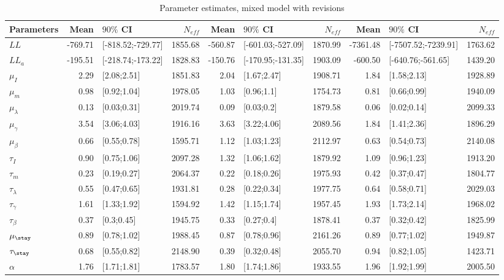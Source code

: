 \begin{table}

\caption{\label{tab:}Parameter estimates, mixed model with revisions}
\centering
\begin{tabular}[t]{lrlrrlrrlr}
\toprule
Parameters & Mean & $90\%$ CI & $N_{eff}$ & Mean & $90\%$ CI & $N_{eff}$ & Mean & $90\%$ CI & $N_{eff}$\\
\midrule
$LL$ & -769.71 & [-818.52;-729.77] & 1855.68 & -560.87 & [-601.03;-527.09] & 1870.99 & -7361.48 & [-7507.52;-7239.91] & 1763.62\\
$LL_a$ & -195.51 & [-218.74;-173.22] & 1828.83 & -150.76 & [-170.95;-131.35] & 1903.09 & -600.50 & [-640.76;-561.65] & 1439.20\\
$\mu_I$ & 2.29 & [2.08;2.51] & 1851.83 & 2.04 & [1.67;2.47] & 1908.71 & 1.84 & [1.58;2.13] & 1928.89\\
$\mu_m$ & 0.98 & [0.92;1.04] & 1978.05 & 1.03 & [0.96;1.1] & 1754.73 & 0.81 & [0.66;0.99] & 1940.09\\
$\mu_\lambda$ & 0.13 & [0.03;0.31] & 2019.74 & 0.09 & [0.03;0.2] & 1879.58 & 0.06 & [0.02;0.14] & 2099.33\\
\addlinespace
$\mu_{\gamma}$ & 3.54 & [3.06;4.03] & 1916.16 & 3.63 & [3.22;4.06] & 2089.56 & 1.84 & [1.41;2.36] & 1896.29\\
$\mu_{\beta}$ & 0.66 & [0.55;0.78] & 1595.71 & 1.12 & [1.03;1.23] & 2112.97 & 0.63 & [0.54;0.73] & 2140.08\\
$\tau_I$ & 0.90 & [0.75;1.06] & 2097.28 & 1.32 & [1.06;1.62] & 1879.92 & 1.09 & [0.96;1.23] & 1913.20\\
$\tau_m$ & 0.23 & [0.19;0.27] & 2064.37 & 0.22 & [0.18;0.26] & 1975.93 & 0.42 & [0.37;0.47] & 1804.77\\
$\tau_{\lambda}$ & 0.55 & [0.47;0.65] & 1931.81 & 0.28 & [0.22;0.34] & 1977.75 & 0.64 & [0.58;0.71] & 2029.03\\
\addlinespace
$\tau_{\gamma}$ & 1.61 & [1.33;1.92] & 1594.92 & 1.42 & [1.15;1.74] & 1957.45 & 1.93 & [1.73;2.14] & 1968.02\\
$\tau_{\beta}$ & 0.37 & [0.3;0.45] & 1945.75 & 0.33 & [0.27;0.4] & 1878.41 & 0.37 & [0.32;0.42] & 1825.99\\
$\mu_{\stay}$ & 0.89 & [0.78;1.02] & 1988.45 & 0.87 & [0.78;0.96] & 2161.26 & 0.89 & [0.77;1.02] & 1949.87\\
$\tau_{\stay}$ & 0.68 & [0.55;0.82] & 2148.90 & 0.39 & [0.32;0.48] & 2055.70 & 0.94 & [0.82;1.05] & 1423.71\\
$\alpha$ & 1.76 & [1.71;1.81] & 1783.57 & 1.80 & [1.74;1.86] & 1933.55 & 1.96 & [1.92;1.99] & 2005.50\\
\bottomrule
\end{tabular}
\end{table}

